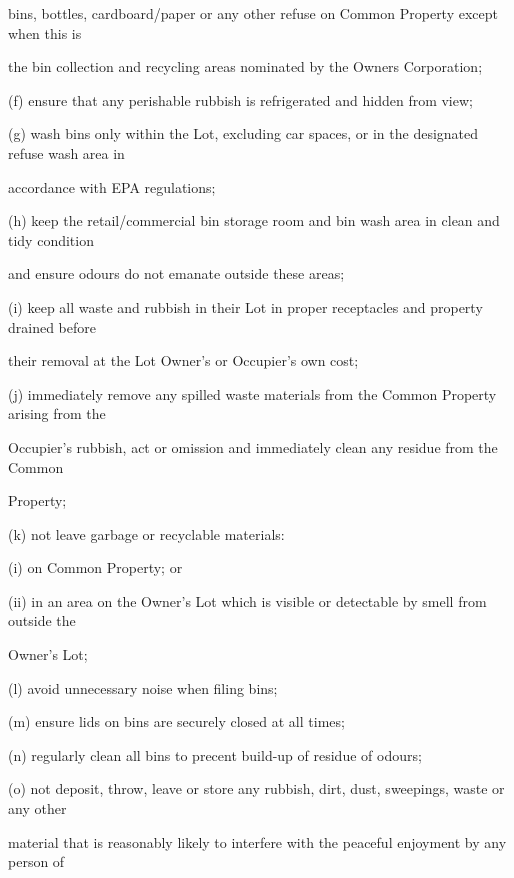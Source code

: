\documentclass{article}
\begin{document}
{\fontsize{10.02}{1}bins, bottles, cardboard/paper or any other refuse on Common Property except when this is }

{\fontsize{10.02}{1}the bin collection and recycling areas nominated by the Owners Corporation; }

{\fontsize{9.962}{1}(f) ensure that any perishable rubbish is refrigerated and hidden from view; }

{\fontsize{9.962}{1}(g) wash bins only within the Lot, excluding car spaces, or in the designated refuse wash area in }

{\fontsize{10.02}{1}accordance with EPA regulations; }

{\fontsize{9.962}{1}(h) keep the retail/commercial bin storage room and bin wash area in clean and tidy condition }

{\fontsize{10.02}{1}and ensure odours do not emanate outside these areas; }

{\fontsize{9.962}{1}(i) keep all waste and rubbish in their Lot in proper receptacles and property drained before }

{\fontsize{10.02}{1}their removal at the Lot Owner’s or Occupier’s own cost; }

{\fontsize{9.962}{1}(j) immediately remove any spilled waste materials from the Common Property arising from the }

{\fontsize{10.02}{1}Occupier’s rubbish, act or omission and immediately clean any residue from the Common }

{\fontsize{10.02}{1}Property; }

{\fontsize{9.962}{1}(k) not leave garbage or recyclable materials: }

{\fontsize{9.962}{1}(i) on Common Property; or }

{\fontsize{9.962}{1}(ii) in an area on the Owner’s Lot which is visible or detectable by smell from outside the }

{\fontsize{10.02}{1}Owner’s Lot; }

{\fontsize{9.962}{1}(l) avoid unnecessary noise when filing bins; }

{\fontsize{9.962}{1}(m) ensure lids on bins are securely closed at all times; }

{\fontsize{9.962}{1}(n) regularly clean all bins to precent build-up of residue of odours; }

{\fontsize{9.962}{1}(o) not deposit, throw, leave or store any rubbish, dirt, dust, sweepings, waste or any other }

{\fontsize{10.02}{1}material that is reasonably likely to interfere with the peaceful enjoyment by any person of }
\end{document}
